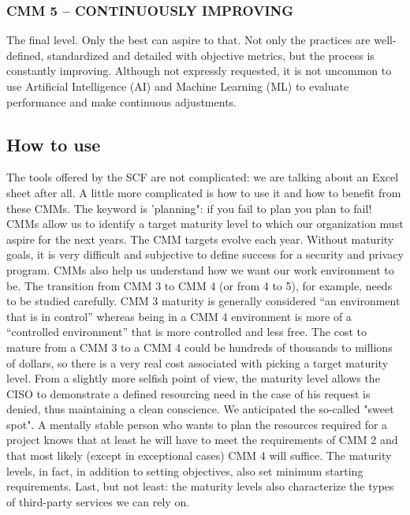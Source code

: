 \subsubsection{CMM 5 – CONTINUOUSLY IMPROVING}
The final level. Only the best can aspire to that. Not only the practices are well-defined, standardized and detailed with objective metrics, but the process is constantly improving. Although not expressly requested, it is not uncommon to use Artificial Intelligence (AI) and Machine Learning (ML) to evaluate performance and make continuous adjustments.
\subsection{How to use}
The tools offered by the SCF are not complicated: we are talking about an Excel sheet after all. A little more complicated is how to use it and how to benefit from these CMMs. The keyword is 'planning": if you fail to plan you plan to fail! CMMs allow us to identify a target maturity level to which our organization must aspire for the next years. The CMM targets evolve each year. Without maturity goals, it is very difficult and subjective to define success for a security and privacy program. CMMs also help us understand how we want our work environment to be. The transition from CMM 3 to CMM 4 (or from 4 to 5), for example, needs to be studied carefully. CMM 3 maturity is generally considered “an environment that is in control” whereas being in a CMM 4 environment is more of a “controlled environment” that is more controlled and less free. The cost to mature from a CMM 3 to a CMM 4 could be hundreds of thousands to millions of dollars, so there is a very real cost associated with picking a target maturity level. From a slightly more selfish point of view, the maturity level allows the CISO to demonstrate a defined resourcing need in the case of his request is denied, thus maintaining a clean conscience. We anticipated the so-called "sweet spot". A mentally stable person who wants to plan the resources required for a project knows that at least he will have to meet the requirements of CMM 2 and that most likely (except in exceptional cases) CMM 4 will suffice. The maturity levels, in fact, in addition to setting objectives, also set minimum starting requirements. Last, but not least: the maturity levels also characterize the types of third-party services we can rely on.
